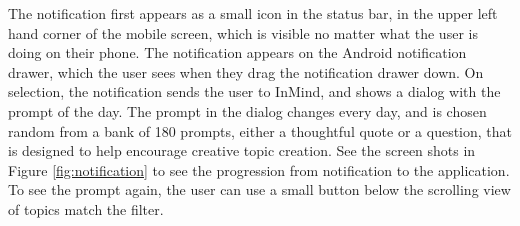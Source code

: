       The notification first appears as a small icon in the status bar,
      in the upper left hand corner of
      the mobile screen, which is visible no matter what the user is doing on their phone.
      The notification appears on the Android notification drawer,
      which the user sees when they drag the notification drawer down.
      On selection,
      the notification sends the user to InMind,
      and shows a dialog with the prompt of the day.
      The prompt in the dialog changes every day,
      and is chosen random from a bank of 180 prompts,
      either a thoughtful quote or a question,
      that is designed to help encourage creative topic creation.
      See the screen shots in Figure \ref{fig:notification} to see the progression
      from notification to the application.
      To see the prompt again, the user can use a small button
      below the scrolling view of topics match the filter.

